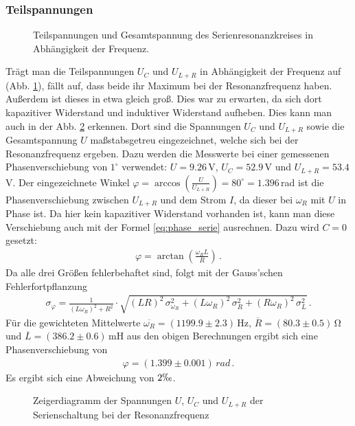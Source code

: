 \documentclass[12pt,a4paper,titlepage,headinclude,bibtotoc]{scrartcl}
\begin{document}
\subsubsection{Teilspannungen}
\begin{figure}[!htb]
	\centering
	
	\caption{Teilspannungen und Gesamtspannung des Serienresonanzkreises in Abhängigkeit der Frequenz.}
	\label{fig:teilU}
\end{figure}
Trägt man die Teilspannungen $U_C$ und $U_{L+R}$ in Abhängigkeit der Frequenz auf (Abb. \ref{fig:teilU}), fällt auf, dass beide ihr Maximum bei der Resonanzfrequenz haben.
Außerdem ist dieses in etwa gleich groß.
Dies war zu erwarten, da sich dort kapazitiver Widerstand und induktiver Widerstand aufheben.
Dies kann man auch in der Abb. \ref{fig:zeigerU} erkennen.
Dort sind die Spannungen $U_C$ und $U_{L+R}$ sowie die Gesamtspannung $U$ maßstabsgetreu eingezeichnet, welche sich bei der Resonanzfrequenz ergeben.
Dazu werden die Messwerte bei einer gemessenen Phasenverschiebung von $1^\circ$ verwendet: $U=9.26\,$V, $U_C=52.9\,$V und $U_{L+R}=53.4\,$V. 
Der eingezeichnete Winkel $\varphi=\arccos\left(\frac{U}{U_{L+R}}\right)=80^\circ=1.396\,$rad ist die Phasenverschiebung zwischen $U_{L+R}$ und dem Strom $I$, da dieser bei $\omega_R$ mit $U$ in Phase ist.
Da hier kein kapazitiver Widerstand vorhanden ist, kann man diese Verschiebung auch mit der Formel \eqref{eq:phase_serie} ausrechnen. Dazu wird $C=0$ gesetzt:
\begin{align}
	\varphi=\arctan\left(\frac{\omega_R L}{R}\right)\,.
\end{align}
Da alle drei Größen fehlerbehaftet sind, folgt mit der Gauss'schen Fehlerfortpflanzung
\begin{align}	
	\sigma_{\varphi}=\frac{1}{(L \omega_R)^{2} + R^{2}} \cdot \sqrt{(LR)^{2}\, \sigma_{\omega_R}^{2} + (L \omega_R)^{2}\,\sigma_{R}^{2}  + (R \omega_R)^{2}\,\sigma_{L}^{2}}\,.
\end{align}
Für die gewichteten Mittelwerte $\overline{\omega_R}=(1199.9\pm 2.3)\,\si\hertz$, $\overline{R}=(80.3 \pm 0.5)\,\si\ohm$ und $\overline{L}=(386.2 \pm 0.6)\,\si{\milli\henry}$ aus den obigen Berechnungen ergibt sich eine Phasenverschiebung von
\begin{align*}
	\varphi=(1.399 \pm 0.001)\,\si{rad}\,.
\end{align*}
Es ergibt sich eine Abweichung von $2\permil$.
\begin{figure}[!htb]
	\centering	
	\caption{Zeigerdiagramm der Spannungen $U$, $U_C$ und $U_{L+R}$ der Serienschaltung bei der Resonanzfrequenz}
	\label{fig:zeigerU}
\end{figure}
\newpage
\end{document}
